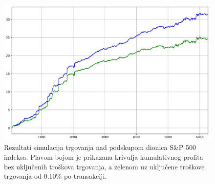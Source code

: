 \documentclass[lmodern, utf8, diplomski, numeric]{fer}
\begin{document}
  
  \begin{figure}[p]
    \centering
    \includegraphics[width=\linewidth]{graphics/results1.pdf}
    \caption{Rezultati simulacija trgovanja nad podskupom dionica S\&P 500 indeksa. Plavom bojom je prikazana krivulja kumulativnog profita bez uključenih troškova trgovanja, a zelenom uz uključene troškove trgovanja od 0.10\% po transakciji.}
    \label{fig:result1}
  \end{figure}
\end{document}
